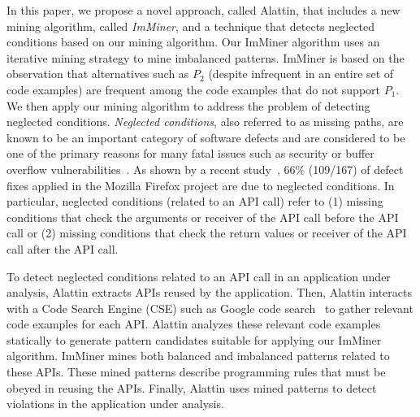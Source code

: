 In this paper, we propose a novel approach, called Alattin, that includes a new mining algorithm, called \emph{ImMiner}, and a technique that detects neglected conditions based on our mining algorithm. Our ImMiner algorithm uses an iterative mining strategy to mine imbalanced patterns. ImMiner is based on the observation that alternatives such as $P_2$ (despite infrequent in an entire set of code examples) are frequent among the code examples that do not support $P_1$. We then apply our mining algorithm to address the problem of detecting neglected conditions. \emph{Neglected conditions}, also referred to as missing paths, are known to be an important category of software defects and are considered to be one of the primary reasons for many fatal issues such as security or buffer overflow vulnerabilities~\cite{chang07:finding}. As shown by a recent study~\cite{chang07:finding}, 66\% (109/167) of defect fixes applied in the Mozilla Firefox project are due to neglected conditions. In particular, neglected conditions (related to an API call) refer to 
(1) missing conditions that check the arguments or receiver of the API call before the API call or 
(2) missing conditions that check the return values or receiver of the API call after the API call.

To detect neglected conditions related to an API call in an application under analysis, Alattin extracts APIs reused by the application. Then, Alattin interacts with a Code Search Engine (CSE) such as Google code search~\cite{GCSE} to gather
relevant code examples for each API. Alattin analyzes these relevant code examples statically to generate pattern candidates suitable for applying our ImMiner algorithm. ImMiner mines both balanced and imbalanced patterns related to these APIs. These mined patterns describe programming rules that must be obeyed in reusing the APIs. Finally, Alattin uses mined patterns to detect violations in the application under analysis.

